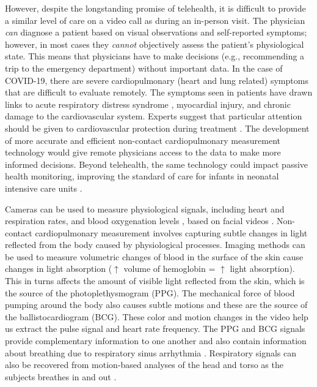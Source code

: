 \documentclass{article}
\begin{document}
However, despite the longstanding promise of telehealth, it is difficult to provide a similar level of care on a video call as during an in-person visit. The physician \textit{can} diagnose a patient based on visual observations and self-reported symptoms; however, in most cases they \textit{cannot} objectively assess the patient's physiological state. This means that physicians have to make decisions (e.g., recommending a trip to the emergency department) without important data. In the case of COVID-19, there are severe cardiopulmonary (heart and lung related) symptoms that are difficult to evaluate remotely. The symptoms seen in patients have drawn links to acute respiratory distress syndrome \citep{xu2020pathological}, myocardial injury, and chronic damage to the cardiovascular system. Experts suggest that particular attention should be given to cardiovascular protection during treatment \citep{zheng2020covid}. The development of more accurate and efficient non-contact cardiopulmonary measurement technology would give remote physicians access to the data to make more informed decisions. Beyond telehealth, the same technology could impact passive health monitoring, improving the standard of care for infants in neonatal intensive care units  \citep{villarroel2019non}.

Cameras can be used to measure physiological signals, including heart and respiration rates, and blood oxygenation levels \citep{poh2010non,guazzi2015non,chen2018deepphys}, based on facial videos \citep{takano2007heart,verkruysse2008remote}. Non-contact cardiopulmonary measurement involves capturing subtle changes in light reflected from the body caused by physiological processes. Imaging methods can be used to measure volumetric changes of blood in the surface of the skin cause changes in light absorption ($\uparrow$ volume of hemoglobin = $\uparrow$ light absorption). This in turns affects the amount of visible light reflected from the skin, which is the source of the photoplethysmogram (PPG). The mechanical force of blood pumping around the body also causes subtle motions and these are the source of the ballistocardiogram (BCG). These color and motion changes in the video help us extract the pulse signal and heart rate frequency. The PPG and BCG signals provide complementary information to one another and also contain information about breathing due to respiratory sinus arrhythmia \citep{poh2010advancements}. Respiratory signals can also be recovered from motion-based analyses of the head and torso as the subjects breathes in and out \citep{tarassenko2014non}.
\end{document}
